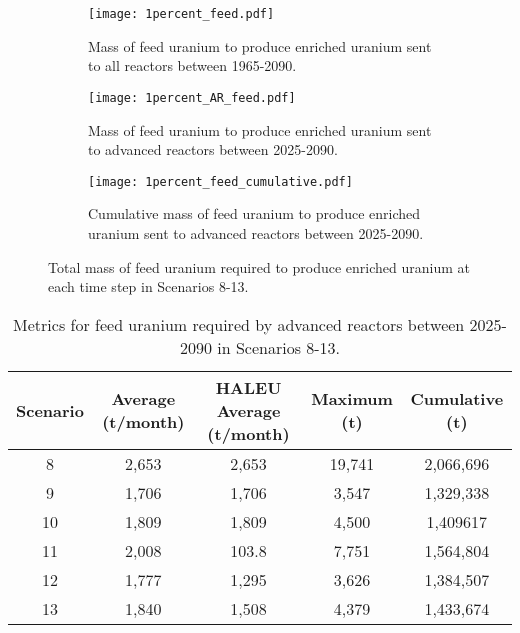 \begin{figure}
    \centering
    \begin{subfigure}[b]{0.45\textwidth}
        \centering
        \texttt{[image: 1percent\_feed.pdf]}
        \caption{Mass of feed uranium to produce enriched uranium sent to 
        all reactors between 1965-2090.}
        \label{fig:1percent_all_feed}
    \end{subfigure}
    \hfill
    \begin{subfigure}[b]{0.45\textwidth}
        \centering
        \texttt{[image: 1percent\_AR\_feed.pdf]}
        \caption{Mass of feed uranium to produce enriched uranium sent to 
        advanced reactors between 2025-2090.}
        \label{fig:1percent_AR_feed}
    \end{subfigure}
    \begin{subfigure}[b]{0.45\textwidth}
        \centering
        \texttt{[image: 1percent\_feed\_cumulative.pdf]}
        \caption{Cumulative mass of feed uranium to produce enriched uranium sent to 
        advanced reactors between 2025-2090.}
        \label{fig:1percent_feed_cumulative}
    \end{subfigure}
       \caption{Total mass of feed uranium required to produce enriched uranium
       at each time step in Scenarios 8-13.}
       \label{fig:1percent_feed}
\end{figure}

\begin{table}
    \centering 
    \caption{Metrics for feed uranium required by advanced reactors 
    between 2025-2090 in Scenarios 8-13.}
    \label{tab:1percent_feed}
    \begin{tabular}{c c c c c}
        \hline
        Scenario & Average (t/month) & \gls{HALEU} Average  
        (t/month) & Maximum (t) & Cumulative (t)\\\hline
        8 & 2,653 & 2,653 & 19,741 & 2,066,696\\
        9 & 1,706 & 1,706 & 3,547 & 1,329,338\\
        10 & 1,809 & 1,809 & 4,500 & 1,409617\\
        11 & 2,008 & 103.8 & 7,751 & 1,564,804\\
        12 & 1,777 & 1,295 & 3,626 & 1,384,507\\
        13 & 1,840 & 1,508 & 4,379 & 1,433,674\\
        \hline
    \end{tabular}
\end{table}

